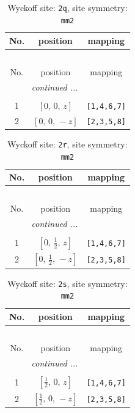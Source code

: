 \documentclass[fleqn,8pt]{jsarticle}
\begin{document}
\begin{longtable}{ccc}
\caption{Wyckoff site: {\tt 2q}, site symmetry: {\tt mm2}}
 \\
 \hline \hline
No. & position & mapping \\ \hline \endfirsthead

\multicolumn{2}{l}{\tablename\ \thetable{}} \\
 \hline \hline
No. & position & mapping \\ \hline \endhead

 \hline \hline
\multicolumn{2}{r}{\footnotesize\it continued ...} \\ \endfoot

 \hline \hline
\multicolumn{2}{r}{} \\ \endlastfoot

1 & $\left[ 0,\, 0,\, z \right]$ & {\tt [1,4,6,7]} \\ \hline
2 & $\left[ 0,\, 0,\, - z \right]$ & {\tt [2,3,5,8]} \\
\end{longtable}
\renewcommand{\arraystretch}{1.2}
\begin{longtable}{ccc}
\caption{Wyckoff site: {\tt 2r}, site symmetry: {\tt mm2}}
 \\
 \hline \hline
No. & position & mapping \\ \hline \endfirsthead

\multicolumn{2}{l}{\tablename\ \thetable{}} \\
 \hline \hline
No. & position & mapping \\ \hline \endhead

 \hline \hline
\multicolumn{2}{r}{\footnotesize\it continued ...} \\ \endfoot

 \hline \hline
\multicolumn{2}{r}{} \\ \endlastfoot

1 & $\left[ 0,\, \frac{1}{2},\, z \right]$ & {\tt [1,4,6,7]} \\ \hline
2 & $\left[ 0,\, \frac{1}{2},\, - z \right]$ & {\tt [2,3,5,8]} \\
\end{longtable}
\renewcommand{\arraystretch}{1.2}
\begin{longtable}{ccc}
\caption{Wyckoff site: {\tt 2s}, site symmetry: {\tt mm2}}
 \\
 \hline \hline
No. & position & mapping \\ \hline \endfirsthead

\multicolumn{2}{l}{\tablename\ \thetable{}} \\
 \hline \hline
No. & position & mapping \\ \hline \endhead

 \hline \hline
\multicolumn{2}{r}{\footnotesize\it continued ...} \\ \endfoot

 \hline \hline
\multicolumn{2}{r}{} \\ \endlastfoot

1 & $\left[ \frac{1}{2},\, 0,\, z \right]$ & {\tt [1,4,6,7]} \\ \hline
2 & $\left[ \frac{1}{2},\, 0,\, - z \right]$ & {\tt [2,3,5,8]} \\
\end{longtable}
\end{document}
